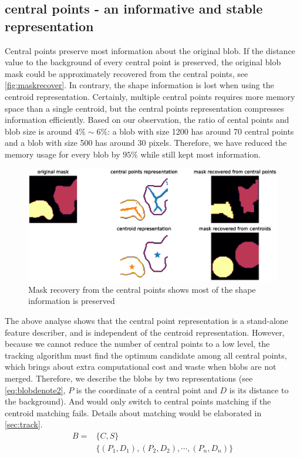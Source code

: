 \subsection{central points - an informative and stable representation}
Central points preserve most information about the original blob. If the distance value to the background of every central point is preserved, the original blob mask could be approximately recovered from the central points, see \autoref{fig:maskrecover}. In contrary, the shape information is lost when using the centroid representation. Certainly, multiple central points requires more memory space than a single centroid, but the central points representation compresses information efficiently. Based on our observation, the ratio of cental points and blob size is around $4\%\sim6\%$: a blob with size 1200 has around 70 central points and a blob with size 500 has around 30 pixels. Therefore, we have reduced the memory usage for every blob by $95\%$ while still kept most information.
\begin{figure}
  \centering
  \includegraphics[width=\textwidth]{figures/maskrecover.eps}
  \caption{Mask recovery from the central points shows most of the shape information is preserved}\label{fig:maskrecover}
\end{figure}

The above analyse shows that the central point representation is a stand-alone feature describer, and is independent of the centroid representation. However, because we cannot reduce the number of central points to a low level, the tracking algorithm must find the optimum candidate among all central points, which brings about extra computational cost and waste when blobs are not merged. Therefore, we describe the blobs by two representations (see \autoref{eq:blobdenote2}, $P$ is the coordinate of a central point and $D$ is its distance to the background). And would only switch to central points matching if the centroid matching fails. Details about matching would be elaborated in \autoref{sec:track}.
\begin{equation}\label{eq:blobdenote2}
  \begin{split}
        B = &\{C,S\} \\
        &\{(P_1,D_1),(P_2,D_2),\cdots,(P_n,D_n)\}
      \end{split}
\end{equation}

